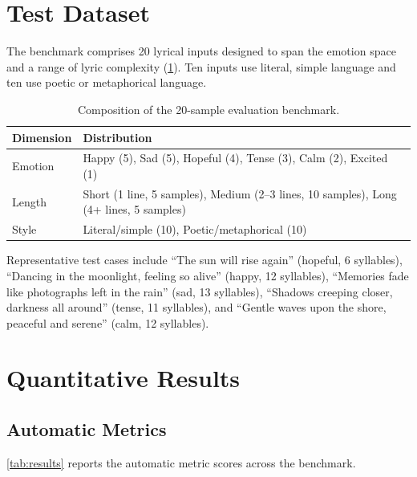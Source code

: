\section{Test Dataset}
\label{sec:ev-dataset}

The benchmark comprises 20 lyrical inputs designed to span the emotion space
and a range of lyric complexity (\ref{tab:dataset}). Ten inputs use
literal, simple language and ten use poetic or metaphorical language.

\begin{table}[ht]
\centering
\caption[Benchmark composition]{Composition of the 20-sample evaluation
benchmark.}
\label{tab:dataset}
\begin{tabular}{l p{8.6cm}}
\toprule
\textbf{Dimension} & \textbf{Distribution} \\
\midrule
Emotion & Happy (5), Sad (5), Hopeful (4), Tense (3), Calm (2), Excited (1) \\
Length & Short (1 line, 5 samples), Medium (2--3 lines, 10 samples), Long
(4+ lines, 5 samples) \\
Style & Literal/simple (10), Poetic/metaphorical (10) \\
\bottomrule
\end{tabular}
\end{table}

Representative test cases include \enquote{The sun will rise again}
(hopeful, 6 syllables), \enquote{Dancing in the moonlight, feeling so
alive} (happy, 12 syllables), \enquote{Memories fade like photographs left
in the rain} (sad, 13 syllables), \enquote{Shadows creeping closer,
darkness all around} (tense, 11 syllables), and \enquote{Gentle waves upon
the shore, peaceful and serene} (calm, 12 syllables).

\section{Quantitative Results}
\label{sec:ev-quantitative}

\subsection{Automatic Metrics}

\ref{tab:results} reports the automatic metric scores across the
benchmark.

